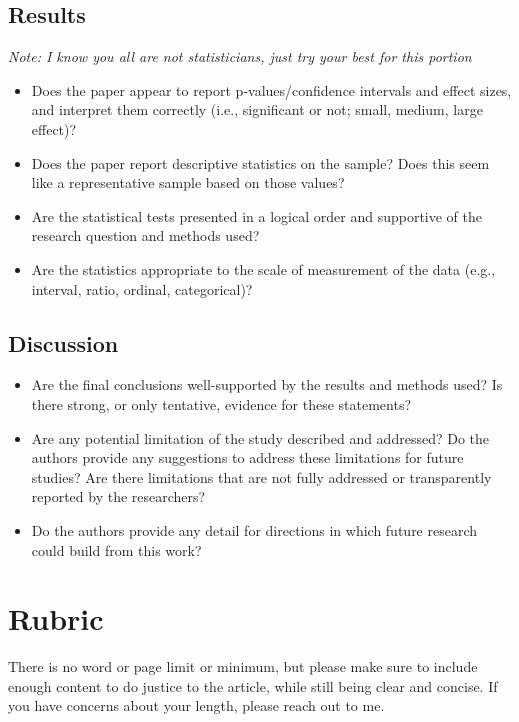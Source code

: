 \documentclass[
  12pt,
  letterpaper,
]{scrartcl}
\begin{document}
\subsection{Results}\label{results}

\emph{Note: I know you all are not statisticians, just try your best for
this portion}

\begin{itemize}
\item
  Does the paper appear to report p-values/confidence intervals and
  effect sizes, and interpret them correctly (i.e., significant or not;
  small, medium, large effect)?
\item
  Does the paper report descriptive statistics on the sample? Does this
  seem like a representative sample based on those values?
\item
  Are the statistical tests presented in a logical order and supportive
  of the research question and methods used?
\item
  Are the statistics appropriate to the scale of measurement of the data
  (e.g., interval, ratio, ordinal, categorical)?
\end{itemize}

\subsection{Discussion}\label{discussion}

\begin{itemize}
\item
  Are the final conclusions well-supported by the results and methods
  used? Is there strong, or only tentative, evidence for these
  statements?
\item
  Are any potential limitation of the study described and addressed? Do
  the authors provide any suggestions to address these limitations for
  future studies? Are there limitations that are not fully addressed or
  transparently reported by the researchers?
\item
  Do the authors provide any detail for directions in which future
  research could build from this work?
\end{itemize}

\section{Rubric}\label{rubric}

There is no word or page limit or minimum, but please make sure to
include enough content to do justice to the article, while still being
clear and concise. If you have concerns about your length, please reach
out to me.
\end{document}
